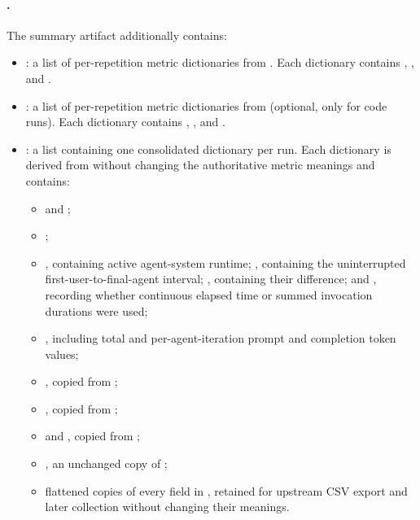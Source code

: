 \documentclass[11pt]{article}
\begin{document}
\paragraph{\texorpdfstring{}{<row\_slug>\_summary.json}.}
The summary artifact additionally contains:
\begin{itemize}
  \item {}: a list of per-repetition metric dictionaries from .
  Each dictionary contains , , and .
  \item {}: a list of per-repetition metric dictionaries from  (optional, only for code runs).
  Each dictionary contains , , and .
  \item {}: a list containing one consolidated dictionary per run.
  Each dictionary is derived from  without changing the authoritative metric meanings and contains:
  \begin{itemize}
    \item {} and ;
    \item {};
    \item {}, containing active agent-system runtime; , containing the uninterrupted first-user-to-final-agent interval; , containing their difference; and , recording whether continuous elapsed time or summed invocation durations were used;
    \item {}, including total and per-agent-iteration prompt and completion token values;
    \item {}, copied from ;
    \item {}, copied from ;
    \item {} and , copied from ;
    \item {}, an unchanged copy of ;
    \item flattened copies of every field in , retained for upstream CSV export and later collection without changing their meanings.
  \end{itemize}
\end{itemize}
\end{document}
